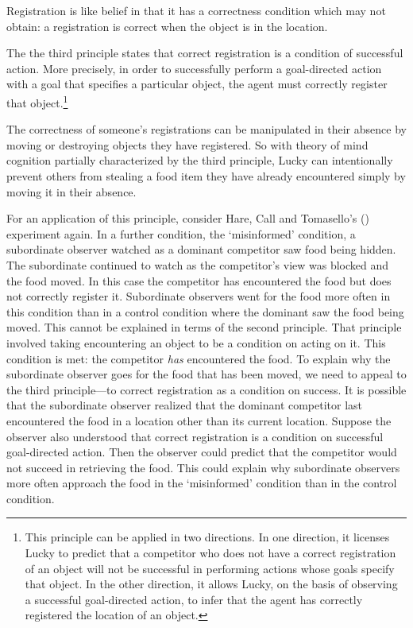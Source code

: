 \documentclass[12pt,\papersize]{extarticle}
\begin{document}
Registration is like belief in that it has a correctness condition which may not obtain: a registration is correct when the object is in the location.   

The the third principle states that correct registration is a condition of successful action.  More precisely, in order to successfully perform a goal-directed action with a goal that specifies a particular object, the agent must correctly register that object.\footnote{
This principle can be applied in two directions.  In one direction, it licenses Lucky to predict that a competitor who does not have a correct registration of an object will not be successful in performing actions whose goals specify that object.  In the other direction, it allows Lucky, on the basis of observing a successful goal-directed action, to infer that the agent has correctly registered the location of an object.
}

The correctness of someone’s registrations can be manipulated in their absence by moving or destroying objects they have registered.  So with theory of mind cognition partially characterized by the third principle, Lucky can intentionally prevent others from stealing a food item they have already encountered simply by moving it in their absence.

For an application of this principle, consider Hare, Call and Tomasello’s (\citeyear[]{en_1545}) experiment again.  In a further condition, the `misinformed' condition, a subordinate observer watched as a dominant competitor saw food being hidden.  The subordinate continued to watch as the competitor’s view was blocked and the food moved.  In this case the competitor has encountered the food but does not correctly register it.  
Subordinate observers went for the food more often in this condition than in a control condition where the dominant saw the food being moved.  
This cannot be explained in terms of the second principle.  That principle involved taking encountering an object to be a condition on acting on it.  This condition is met: the competitor \textit{has} encountered the food.  To explain why the subordinate observer goes for the food that has been moved, we need to appeal to the third principle—to correct registration as a condition on success.  It is possible that the subordinate observer realized that the dominant competitor last encountered the food in a location other than its current location.  Suppose the observer also understood that correct registration is a condition on successful goal-directed action.  Then the observer could predict that the competitor would not succeed in retrieving the food.  This could explain why  subordinate observers  more often approach the food in the `misinformed' condition than in the control condition.  
\end{document}
